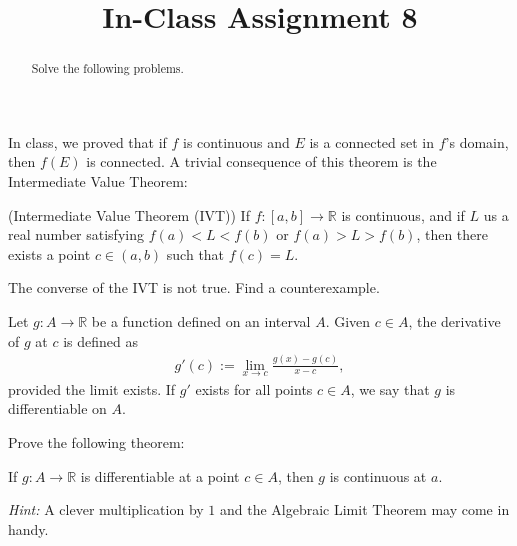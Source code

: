 \documentclass{ximera}
\begin{document}
    \title{In-Class Assignment 8}
    \begin{abstract} Solve the following problems. \end{abstract}
    \maketitle

In class, we proved that if $f$ is continuous and $E$ is a connected set in $f$'s domain, then $f(E)$ is connected.  A trivial consequence of this theorem is the Intermediate Value Theorem:
\begin{theorem}{(Intermediate Value Theorem (IVT))}
    If $f:[a,b] \to \mathbb{R}$ is continuous, and if $L$ us a real number satisfying $f(a) < L < f(b)$ or $f(a) > L > f(b)$, then there exists a point $c \in (a,b)$ such that $f(c) = L$.
\end{theorem}

\begin{exercise}
    The converse of the IVT is not true.  Find a counterexample.
\end{exercise}

\newpage

\begin{definition}
    Let $g:A \to \mathbb{R}$ be a function defined on an interval $A$.  Given $c \in A$, the derivative of $g$ at $c$ is defined as
    \begin{align*}
        g'(c) := \lim\limits_{x\to c} \frac{g(x) - g(c)}{x-c},
    \end{align*}
    provided the limit exists.  If $g'$ exists for all points $c \in A$, we say that $g$ is differentiable on $A$.
\end{definition}

\begin{exercise}
Prove the following theorem:
\begin{theorem}
    If $g:A \to \mathbb{R}$ is differentiable at a point $c \in A$, then $g$ is continuous at $a$.
\end{theorem}
\textit{Hint:}  A clever multiplication by $1$ and the Algebraic Limit Theorem may come in handy.
\end{exercise}
\end{document}
